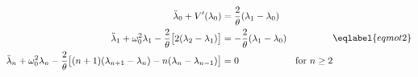 \begin{equation}
\begin{split}
\ddot\lambda_0 + V'(\lambda_0) &= \frac 2\theta (\lambda_1-\lambda_0) \\
\ddot\lambda_1 + \omega_0^2 \lambda_1 - \frac2\theta\bigl[2(
\lambda_2-\lambda_1)\bigr] &= -\frac2\theta(\lambda_1-\lambda_0) \\
\ddot\lambda_n + \omega_0^2 \lambda_n - \frac2\theta\bigl[(n+1)(
\lambda_{n+1}-\lambda_n) - n(\lambda_n-\lambda_{n-1})\bigr] &= 0 
\qquad\qquad\qquad\text{for $n\ge 2$}
\end{split}
\eqlabel{eqmot2}
\end{equation}

